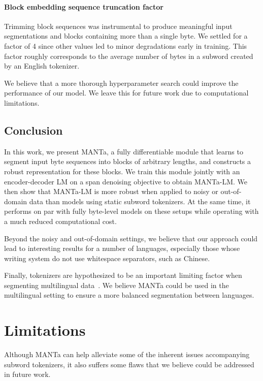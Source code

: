 \paragraph{Block embedding sequence truncation factor} Trimming block sequences was instrumental to produce meaningful input segmentations and blocks containing more than a single byte. We settled for a factor of 4 since other values led to minor degradations early in training. This factor roughly corresponds to the average number of bytes in a subword created by an English tokenizer.

We believe that a more thorough hyperparameter search could improve the performance of our model. We leave this for future work due to computational limitations.

\subsection{Conclusion}
In this work, we present MANTa, a fully differentiable module that learns to segment input byte sequences into blocks of arbitrary lengths, and constructs a robust representation for these blocks. We train this module jointly with an encoder-decoder LM on a span denoising objective to obtain MANTa-LM. We then show that MANTa-LM is more robust when applied to noisy or out-of-domain data than models using static subword tokenizers. At the same time, it performs on par with fully byte-level models on these setups while operating with a much reduced computational cost.

Beyond the noisy and out-of-domain settings, we believe that our approach could lead to interesting results for a number of languages, especially those whose writing system do not use whitespace separators, such as Chinese.

Finally, tokenizers are hypothesized to be an important limiting factor when segmenting multilingual data~\cite{rust-etal-2021-good}. We believe MANTa could be used in the multilingual setting to ensure a more balanced segmentation between languages.


\section*{Limitations}
Although MANTa can help alleviate some of the inherent issues accompanying subword tokenizers, it also suffers some flaws that we believe could be addressed in future work.

